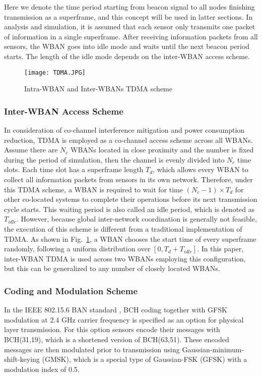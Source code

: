 \documentclass[12pt,draftcls,a4paper,onecolumn,journal]{IEEEtran}
\begin{document}
Here we denote the time period starting from beacon signal to all nodes finishing transmission as a superframe, and this concept will be used in latter sections. In analysis and simulation, it is assumed that each sensor only transmits one packet of information in a single superframe. After receiving information packets from all sensors, the WBAN goes into idle mode and waits until the next beacon period starts. The length of the idle mode depends on the inter-WBAN access scheme.

\begin{figure}
\centering
\texttt{[image: TDMA.JPG]}
\caption{Intra-WBAN and Inter-WBANs TDMA scheme}
\label{fig: TDMA}
\end{figure}

\subsubsection{Inter-WBAN Access Scheme}
In consideration of co-channel interference mitigation and power consumption reduction, TDMA is employed as a co-channel access scheme across all WBANs. Assume there are $N_c$ WBANs located in close proximity and the number is fixed during the period of simulation, then the channel is evenly divided into $N_c$ time slots. Each time slot has a superframe length $T_d$, which allows every WBAN to collect all information packets from sensors in its own network. Therefore, under this TDMA scheme, a WBAN is required to wait for time $(N_c-1) \times T_d$ for other co-located systems to complete their operations before its next transmission cycle starts. This waiting period is also called an idle period, which is denoted as $T_{idle}$. However, because global inter-network coordination is generally not feasible, the execution of this scheme is different from a traditional implementation of TDMA. As shown in Fig.~\ref{fig: TDMA}, a WBAN chooses the start time of every superframe randomly, following a uniform distribution over $[0, T_d+T_{idle}]$. In this paper, inter-WBAN TDMA is used across two WBANs employing this configuration, but this can be generalized to any number of closely located WBANs.

\subsubsection{Coding and Modulation Scheme}
In the IEEE 802.15.6 BAN standard \cite{tg6_d}, BCH coding together with GFSK modulation at 2.4 GHz carrier frequency is specified as an option for physical layer transmission. For this option sensors encode their messages with BCH(31,19), which is a shortened version of BCH(63,51). These encoded messages are then modulated prior to transmission using Gaussian-minimum-shift-keying (GMSK), which is a special type of Gaussian-FSK (GFSK) with a modulation index of 0.5.
\end{document}
